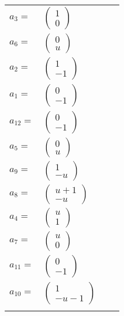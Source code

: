 \documentclass[1p]{elsarticle_modified}
\theoremstyle{definition}
\begin{document}
\begin{tabular}{m{7pt} m{180pt} m{7pt} m{180pt} }
\flushright $a_{3}=$&$\begin{pmatrix}1\\0\end{pmatrix}$ \\
\flushright $a_{6}=$&$\begin{pmatrix}0\\u\end{pmatrix}$ \\
\flushright $a_{2}=$&$\begin{pmatrix}1\\-1\end{pmatrix}$ \\
\flushright $a_{1}=$&$\begin{pmatrix}0\\-1\end{pmatrix}$ \\
\flushright $a_{12}=$&$\begin{pmatrix}0\\-1\end{pmatrix}$ \\
\flushright $a_{5}=$&$\begin{pmatrix}0\\u\end{pmatrix}$ \\
\flushright $a_{9}=$&$\begin{pmatrix}1\\- u\end{pmatrix}$ \\
\flushright $a_{8}=$&$\begin{pmatrix}u+1\\- u\end{pmatrix}$ \\
\flushright $a_{4}=$&$\begin{pmatrix}u\\1\end{pmatrix}$ \\
\flushright $a_{7}=$&$\begin{pmatrix}u\\0\end{pmatrix}$ \\
\flushright $a_{11}=$&$\begin{pmatrix}0\\-1\end{pmatrix}$ \\
\flushright $a_{10}=$&$\begin{pmatrix}1\\- u-1\end{pmatrix}$\\&\end{tabular}
\end{document}
